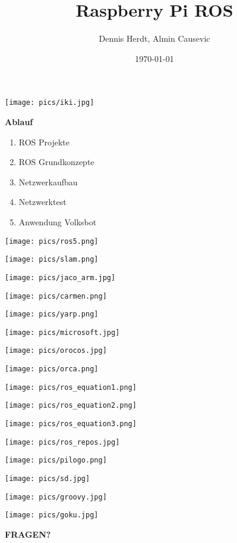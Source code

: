 \documentclass{beamer}
\title[Raspberry Pi ROS]{Raspberry Pi ROS}
\author{Dennis Herdt, Almin Causevic}
\institute[I_HS Wgt-Rav]{Angewandte Informatik HS Weingarten-Ravensburg}
\date{\today}
\begin{document}
\frame{\titlepage}

\begin{frame}
\centerline{\texttt{[image: pics/iki.jpg]}}
\end{frame}

\begin{frame}
{\bf Ablauf}
\begin{enumerate}
\item ROS Projekte
\item ROS Grundkonzepte
\item Netzwerkaufbau
\item Netzwerktest
\item Anwendung Volksbot
\end{enumerate}
\end{frame}

\begin{frame}
\centerline{\texttt{[image: pics/ros5.png]}}
\end{frame}

\begin{frame}
\centerline{\texttt{[image: pics/slam.png]}}
\end{frame}

\begin{frame}
\centerline{\texttt{[image: pics/jaco\_arm.jpg]}}
\end{frame}

\begin{frame}
\parbox{5cm}{\texttt{[image: pics/carmen.png]}}
\parbox{5cm}{\texttt{[image: pics/yarp.png]}}
\parbox{5cm}{\texttt{[image: pics/microsoft.jpg]}}
\hspace{5cm}
\parbox{5cm}{\texttt{[image: pics/orocos.jpg]}}
\parbox{5cm}{\texttt{[image: pics/orca.png]}}
\end{frame}

\begin{frame}
\centerline{\texttt{[image: pics/ros\_equation1.png]}}
\centerline{\texttt{[image: pics/ros\_equation2.png]}}
\centerline{\texttt{[image: pics/ros\_equation3.png]}}
\end{frame}

\begin{frame}
\centerline{\texttt{[image: pics/ros\_repos.jpg]}}
\end{frame}


\begin{frame}
\parbox{5cm}{\texttt{[image: pics/pilogo.png]}}
\parbox{5cm}{\texttt{[image: pics/sd.jpg]}}
\end{frame}

\begin{frame}
\centerline{\texttt{[image: pics/groovy.jpg]}}
\end{frame}

\begin{frame}
\centerline{\texttt{[image: pics/goku.jpg]}}
\vspace{2cm}
\centerline{{\bf \Huge FRAGEN?}}
\end{frame}
\end{document}
